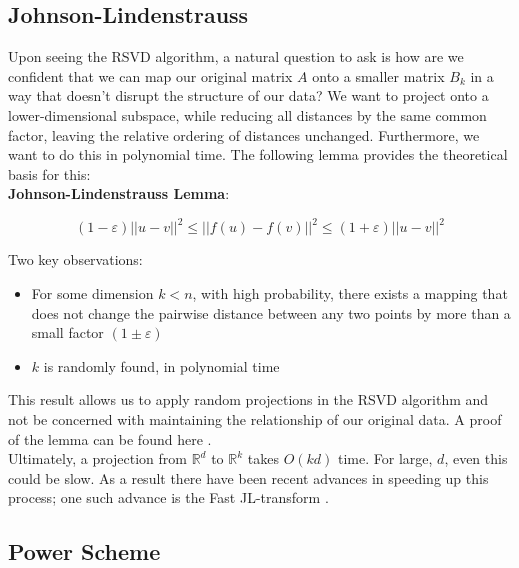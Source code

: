 \documentclass{article}
\begin{document}
\subsection{Johnson-Lindenstrauss}

Upon seeing the RSVD algorithm, a natural question to ask is how are we confident that we can map our original matrix $A$ onto a smaller matrix $B_{k}$ in a way that doesn't disrupt the structure of our data? We want to project onto a lower-dimensional subspace, while reducing all distances by the same common factor, leaving the relative ordering of distances unchanged. Furthermore, we want to do this in polynomial time. The following lemma provides the theoretical basis for this:
\\

\textbf{Johnson-Lindenstrauss Lemma}:
\\ 

$$(1-\varepsilon)||u-v||^{2}\leq||f(u)-f(v)||^{2}\leq(1+\varepsilon)||u-v||^{2}$$

Two key observations:

\begin{itemize}
\item For some dimension $k < n$, with high probability, there exists a mapping that does not change the pairwise distance between any two points by more than a small factor $(1 \pm \varepsilon)$
\item $k$ is randomly found, in polynomial time
\end{itemize}

This result allows us to apply random projections in the RSVD algorithm and not be concerned with maintaining the relationship of our original data. A proof of the lemma can be found here \cite{JL}.
\\

Ultimately, a projection from $\mathbb{R}^d$ to $\mathbb{R}^k$ takes $O(kd)$ time. For large, $d$, even this could be slow. As a result there have been recent advances in speeding up this process; one such advance is the Fast JL-transform \cite{FastJL}.

\subsection{Power Scheme}
\end{document}
